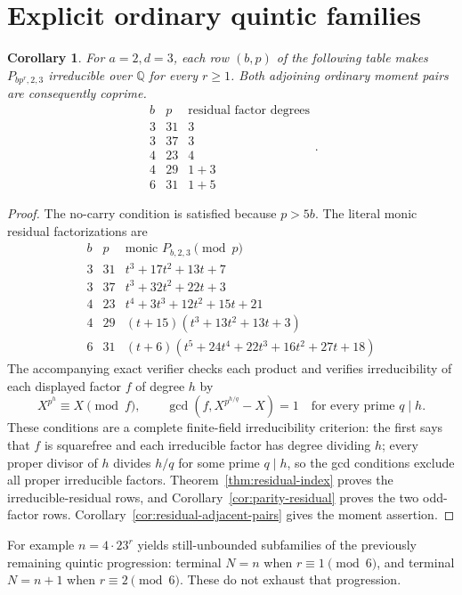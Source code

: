 \documentclass[11pt]{article}
\newtheorem{corollary}[theorem]{Corollary}
\begin{document}
\section{Explicit ordinary quintic families}

\begin{corollary}\label{cor:quintic-residual-families}
For $a=2,d=3$, each row $(b,p)$ of the following table makes
$P_{bp^r,2,3}$ irreducible over $\mathbb Q$ for every $r\ge1$.
Both adjoining ordinary moment pairs are consequently coprime.
\[
 \begin{array}{c|c|c}
 b&p&\text{residual factor degrees}\\ \hline
 3&31&3\\
 3&37&3\\
 4&23&4\\
 4&29&1+3\\
 6&31&1+5
 \end{array}.
\]
\end{corollary}
\begin{proof}
The no-carry condition is satisfied because $p>5b$.
The literal monic residual factorizations are
\[
\begin{array}{c|c|l}
 b&p&\text{monic }P_{b,2,3}\pmod p\\ \hline
3&31&t^3+17t^2+13t+7\\
3&37&t^3+32t^2+22t+3\\
4&23&t^4+3t^3+12t^2+15t+21\\
4&29&(t+15)(t^3+13t^2+13t+3)\\
6&31&(t+6)(t^5+24t^4+22t^3+16t^2+27t+18)
\end{array}
\]
The accompanying exact verifier checks each product and verifies
irreducibility of each displayed factor $f$ of degree $h$ by
\[
 X^{p^h}\equiv X\pmod f,\qquad
 \gcd(f,X^{p^{h/q}}-X)=1
 \quad\text{for every prime }q\mid h.
 \tag{9}
\]
These conditions are a complete finite-field irreducibility criterion:
the first says that $f$ is squarefree and each irreducible factor
has degree dividing $h$; every proper divisor of $h$ divides $h/q$
for some prime $q\mid h$, so the gcd conditions exclude all proper
irreducible factors.
Theorem~\ref{thm:residual-index} proves the irreducible-residual rows,
and Corollary~\ref{cor:parity-residual} proves the two odd-factor rows.
Corollary~\ref{cor:residual-adjacent-pairs} gives the moment assertion.
\end{proof}

For example $n=4\cdot23^r$ yields still-unbounded subfamilies of the
previously remaining quintic progression: terminal $N=n$ when
$r\equiv1\pmod6$, and terminal $N=n+1$ when $r\equiv2\pmod6$.
These do not exhaust that progression.
\end{document}
